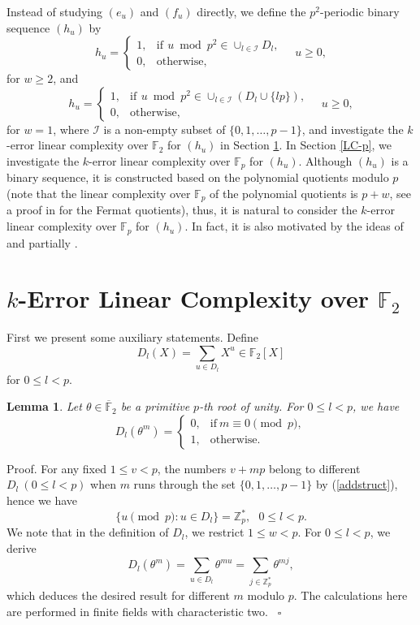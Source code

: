 \documentclass [11pt,a4paper]{article}
\def\F{\mathbb{F}}
\def\Z{\mathbb{Z}}
\newtheorem{lemma}{Lemma}
\begin{document}
Instead of studying $(e_u)$  and $(f_u)$ directly, we define the $p^2$-periodic binary sequence $(h_u)$ by
\begin{equation}\label{hhhh}
h_u=\left\{
\begin{array}{ll}
1, & \mathrm{if}\,\ u\bmod {p^2}\in \cup_{l\in \mathcal{I}} D_l,\\
0, & \mathrm{otherwise},
\end{array}
\right. \quad u\ge 0,
\end{equation}
for $w\ge 2$, and
\begin{equation}\label{hhhh-w=1}
h_u=\left\{
\begin{array}{ll}
1, & \mathrm{if}\,\ u\bmod {p^2}\in \cup_{l\in \mathcal{I}} (D_l\cup \{lp\}),\\
0, & \mathrm{otherwise},
\end{array}
\right. \quad u\ge 0,
\end{equation}
for $w=1$, where $\mathcal{I}$ is a non-empty subset of $\{0,1,\ldots,p-1\}$, and investigate the $k$-error linear complexity over $\F_2$ for $(h_u)$ in Section \ref{LC-2}. In Section \ref{LC-p}, we investigate the $k$-error linear complexity over $\F_p$ for $(h_u)$. Although $(h_u)$ is a binary sequence, it is constructed based on the polynomial quotients modulo $p$ (note that the linear complexity over $\F_p$ of the polynomial quotients is $p+w$, see a proof in  \cite{OS} for the Fermat quotients), thus, it is natural to consider the $k$-error linear complexity over $\F_p$ for $(h_u)$. In fact, it is also motivated by the ideas of \cite{AMW,AW06} and partially \cite{AM,AW,BW,CY,ESK,GLSW,HKN,HMMS}.



\section{$k$-Error Linear Complexity over $\F_2$}\label{LC-2}

First we present some auxiliary statements. Define
$$ D_l(X)= \sum\limits_{u\in D_l}X^u \in \mathbb{F}_2[X]$$
for $0\leq l < p$.

\begin{lemma}\label{lemma-add}
Let $\theta \in \overline{\mathbb{F}}_{2}$ be  a  primitive $p$-th root of
unity. For $0\leq l < p$, we have
$$
D_l(\theta^{m})=\left\{
\begin{array}{ll}
0, & \mathrm{if}~ m\equiv 0 \pmod p,\\
1, & \mathrm{otherwise}.
\end{array}
\right.
$$
\end{lemma}
Proof. For any fixed $1\le v<p$, the numbers $v+mp$ belong to different $D_l~ (0\leq l < p)$ when $m$ runs through the set $\{0,1,\ldots,p-1\}$ by  (\ref{addstruct}), hence we have
$$
\{u\pmod p: u\in D_l\}=\Z_p^*, ~~~0\leq l < p.
$$
 We note that in the definition of $D_l$, we restrict $1\le w<p$. For $0\leq l < p$, we derive
$$
 D_l(\theta^{m})=\sum\limits_{u\in D_l}\theta^{mu}=\sum\limits_{j\in \Z_p^*}\theta^{mj},
 $$
which deduces the desired result for different $m$ modulo $p$. The calculations here are performed in
finite fields with characteristic two. ~\hfill $\square$
\end{document}
